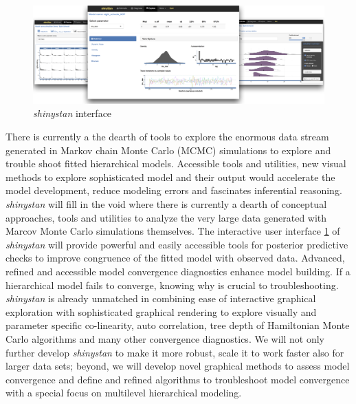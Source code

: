 \documentclass[11pt,notitlepage]{article}
\begin{document}
\begin{figure}
  \vspace{-10pt}
 \includegraphics[scale=1.2]{Figures/shinystan.png}
  \vspace{-12pt}
  \caption{\textit{shinystan} interface}
    \label{fig:shinystan}
 \vspace{- 14pt}
\end{figure}

There is currently a the dearth of tools to explore the enormous data stream 
generated in Markov chain Monte Carlo (MCMC) simulations to explore and 
trouble shoot fitted hierarchical models. 
Accessible tools and utilities, new visual methods to explore sophisticated model and
their output would accelerate the model development, reduce modeling errors and 
fascinates inferential reasoning. \textit{shinystan} will fill in the void where 
there is currently a dearth of conceptual approaches, tools and utilities to 
analyze the very large data generated with Marcov Monte Carlo simulations 
themselves. The interactive user interface \ref{fig:shinystan} of \textit{shinystan} 
will provide powerful and easily accessible tools for posterior predictive checks 
to improve congruence of the fitted model with observed data. Advanced, refined 
and accessible model convergence diagnostics enhance model building. If a hierarchical 
model fails to converge, knowing why is crucial to troubleshooting. \textit{shinystan} 
is already unmatched in combining ease of interactive graphical exploration 
with sophisticated graphical rendering to explore visually and parameter 
specific co-linearity, auto correlation, tree depth of Hamiltonian Monte 
Carlo algorithms and many other convergence diagnostics. We will not only 
further develop \textit{shinystan} to make it more robust, scale it to work 
faster also for larger data sets; beyond, we will develop novel graphical 
methods to assess model convergence and define and refined algorithms to 
troubleshoot model convergence with a special focus on multilevel hierarchical 
modeling. 
\end{document}
